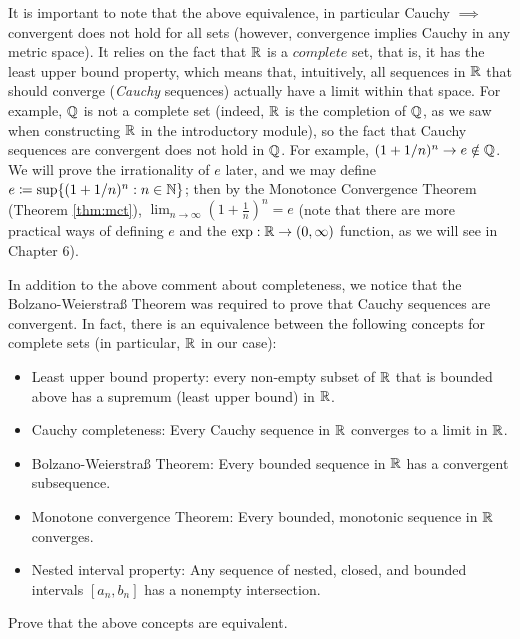 \documentclass[../analysis1.tex]{subfiles}
\begin{document}
\begin{remark}
    It is important to note that the above equivalence, in particular Cauchy $\implies$ convergent does not hold for all sets (however, convergence implies Cauchy in any metric space). It relies on the fact that $\mathbb{R}$ is a $complete$ set, that is, it has the least upper bound property, which means that, intuitively, all sequences in $\mathbb{R}$ that should converge (\textit{Cauchy} sequences) actually have a limit within that space.
    For example, $\mathbb{Q}$ is not a complete set (indeed, $\mathbb{R}$ is the completion of $\mathbb{Q}$, as we saw when constructing $\mathbb{R}$ in the introductory module), so the fact that Cauchy sequences are convergent does not hold in $\mathbb{Q}$. For example, $(1+1/n)^n\to e\notin\mathbb{Q}$. We will prove the irrationality of $e$ later, and we may define $e\coloneqq \sup\{(1+1/n)^n:n\in\mathbb{N}\}$; then by the Monotonce Convergence Theorem (Theorem \ref{thm:mct}), $\lim_{n\to\infty}\left(1+\frac{1}{n}\right)^n=e$ (note that there are more practical ways of defining $e$ and the $\exp:\mathbb{R}\to (0,\infty)$ function, as we will see in Chapter 6).
\end{remark}
\begin{remark}
    In addition to the above comment about completeness, we notice that the Bolzano-Weierstraß Theorem was required to prove that Cauchy sequences are convergent. In fact, there is an equivalence between the following concepts for complete sets (in particular, $\mathbb{R}$ in our case):
    \begin{itemize}
        \item Least upper bound property: every non-empty subset of $\mathbb{R}$ that is bounded above has a supremum (least upper bound) in $\mathbb{R}$.
        \item Cauchy completeness: Every Cauchy sequence in $\mathbb{R}$ converges to a limit in $\mathbb{R}$.
        \item Bolzano-Weierstraß Theorem: Every bounded sequence in $\mathbb{R}$ has a convergent subsequence.
        \item Monotone convergence Theorem: Every bounded, monotonic sequence in $\mathbb{R}$ converges.
        \item Nested interval property: Any sequence of nested, closed, and bounded intervals $[a_n,b_n]$ has a nonempty intersection.
    \end{itemize}
\end{remark}
\begin{exercise*}
    Prove that the above concepts are equivalent. 
\end{exercise*}
\end{document}
